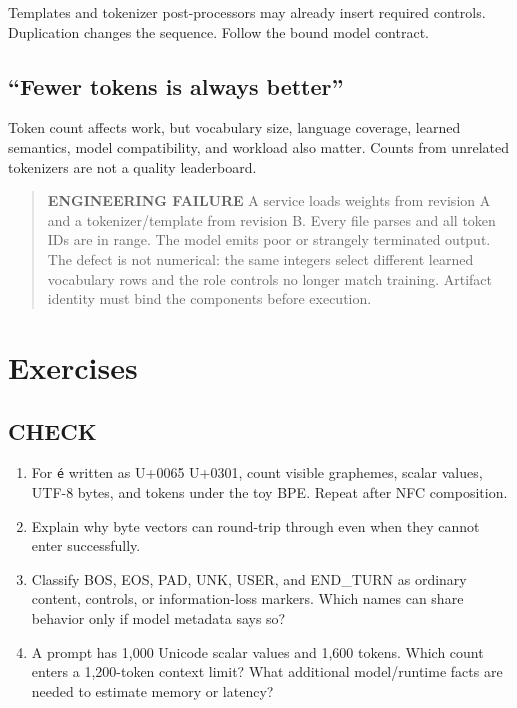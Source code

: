 Templates and tokenizer post-processors may already insert required
controls. Duplication changes the sequence. Follow the bound model
contract.

\subsection{``Fewer tokens is always
better''}\label{fewer-tokens-is-always-better}

Token count affects work, but vocabulary size, language coverage,
learned semantics, model compatibility, and workload also matter. Counts
from unrelated tokenizers are not a quality leaderboard.

\begin{quote}
\textbf{ENGINEERING FAILURE} A service loads weights from revision A and
a tokenizer/template from revision B. Every file parses and all token
IDs are in range. The model emits poor or strangely terminated output.
The defect is not numerical: the same integers select different learned
vocabulary rows and the role controls no longer match training. Artifact
identity must bind the components before execution.
\end{quote}

\section{Exercises}\label{exercises-1}

\subsection{CHECK}\label{check-1}

\begin{enumerate}
\def\labelenumi{\arabic{enumi}.}
\tightlist
\item
  For \texttt{é} written as U+0065 U+0301, count visible graphemes,
  scalar values, UTF-8 bytes, and tokens under the toy BPE. Repeat after
  NFC composition.
\item
  Explain why byte vectors can round-trip through
  \texttt{} even when they cannot enter
  \texttt{} successfully.
\item
  Classify BOS, EOS, PAD, UNK, USER, and END\_TURN as ordinary content,
  controls, or information-loss markers. Which names can share behavior
  only if model metadata says so?
\item
  A prompt has 1,000 Unicode scalar values and 1,600 tokens. Which count
  enters a 1,200-token context limit? What additional model/runtime
  facts are needed to estimate memory or latency?
\end{enumerate}

